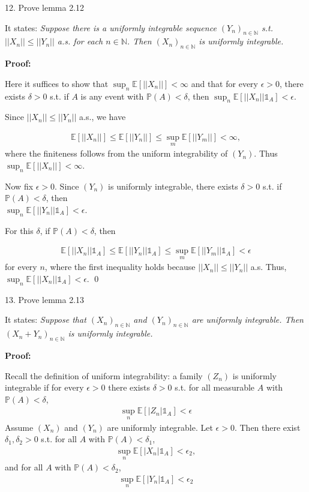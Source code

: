 \documentclass[10pt]{article}
\begin{document}
\newpage

12. Prove lemma 2.12

It states: \textit{Suppose there is a uniformly integrable sequence $(Y_n)_{n \in \mathbb{N}}$ s.t. $||X_n|| \le ||Y_n||$ a.s. for each $n \in \mathbb{N}$. Then $(X_n)_{n \in \mathbb{N}}$ is uniformly integrable.}

\textbf{Proof:}

Here it suffices to show that $\sup_n \mathbb{E}[||X_n||] < \infty$ and that for every $\epsilon > 0$, there exists $\delta > 0$ s.t. if $A$ is any event with $\mathbb{P}(A) < \delta$, then $\sup_n \mathbb{E}[||X_n||\mathbb{1}_A] < \epsilon$.

Since $||X_n|| \le ||Y_n||$ a.s., we have 

\begin{gather*}
    \mathbb{E}[||X_n||] \le \mathbb{E}[||Y_n||] \le \sup_m \mathbb{E}[||Y_m||] < \infty,
\end{gather*}
where the finiteness follows from the uniform integrability of $(Y_n)$. Thus $\sup_n \mathbb{E}[||X_n||] < \infty$.

Now fix $\epsilon > 0$. Since $(Y_n)$ is uniformly integrable, there exists $\delta > 0$ s.t. if $\mathbb{P}(A) < \delta$, then \\$\sup_n \mathbb{E}[||Y_n||\mathbb{1}_A] < \epsilon$.

For this $\delta$, if $\mathbb{P}(A) < \delta$, then 

\begin{gather*}
    \mathbb{E}[||X_n||\mathbb{1}_A] \le \mathbb{E}[||Y_n||\mathbb{1}_A] \le \sup_m \mathbb{E}[||Y_m||\mathbb{1}_A] < \epsilon
\end{gather*}
for every $n$, where the first inequality holds because $||X_n|| \le ||Y_n||$ a.s. Thus, $\sup_n \mathbb{E}[||X_n||\mathbb{1}_A] < \epsilon$. \qed

\hfill 

13. Prove lemma 2.13

It states: \textit{Suppose that $(X_n)_{n \in \mathbb{N}}$ and $(Y_n)_{n \in \mathbb{N}}$ are uniformly integrable. Then $(X_n + Y_n)_{n \in \mathbb{N}}$ is uniformly integrable.}

\textbf{Proof:}

Recall the definition of uniform integrability: a family $(Z_n)$ is uniformly integrable if for every $\epsilon > 0$ there exists $\delta > 0$ s.t. for all measurable $A$ with $\mathbb{P}(A) < \delta$,
\begin{gather*}
    \sup_n \mathbb{E}[|Z_n| \mathbb{1}_A] < \epsilon
\end{gather*}
Assume $(X_n)$ and $(Y_n)$ are uniformly integrable. Let $\epsilon > 0$. Then there exist $\delta_1, \delta_2 > 0$ s.t. for all $A$ with $\mathbb{P}(A) < \delta_1$,
\begin{gather*}
    \sup_n \mathbb{E}[|X_n| \mathbb{1}_A] < \epsilon_2,
\end{gather*}
and for all $A$ with $\mathbb{P}(A) < \delta_2$,
\begin{gather*}
    \sup_n \mathbb{E}[|Y_n| \mathbb{1}_A] < \epsilon_2
\end{gather*}
\end{document}
